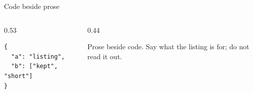 \documentclass[aspectratio=169]{beamer}
\begin{document}
\begin{frame}[fragile]{Code beside prose}

  \begin{columns}[T]
    \begin{column}{0.53\textwidth}
      \vspace{0pt}
\begin{lstlisting}
{
  "a": "listing",
  "b": ["kept", "short"]
}
\end{lstlisting}
    \end{column}
    \begin{column}{0.44\textwidth}
      \vspace{0pt}
      {\small\setlength{\parskip}{0.7em}%
      Prose beside code. Say what the listing is for; do not read it out.\par}
    \end{column}
  \end{columns}

\end{frame}
\end{document}
